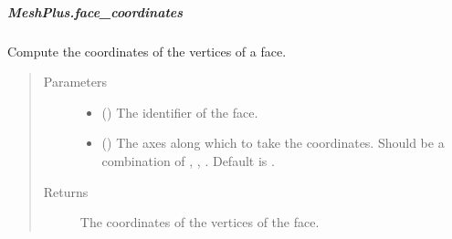 \documentclass[letterpaper,10pt,english]{sphinxmanual}
\begin{document}
\begin{fulllineitems}
\begin{fulllineitems}
\end{fulllineitems}



\subparagraph{MeshPlus.face\_coordinates}
\label{\detokenize{api/generated/directional_clustering.mesh.MeshPlus.face_coordinates:meshplus-face-coordinates}}\label{\detokenize{api/generated/directional_clustering.mesh.MeshPlus.face_coordinates::doc}}

\begin{fulllineitems}
\label{\detokenize{api/generated/directional_clustering.mesh.MeshPlus.face_coordinates:directional_clustering.mesh.MeshPlus.face_coordinates}}
Compute the coordinates of the vertices of a face.
\begin{quote}\begin{description}
\item[{Parameters}] \leavevmode\begin{itemize}
\item {} 
 () \textendash{} The identifier of the face.

\item {} 
 () \textendash{} The axes along which to take the coordinates.
Should be a combination of , , .
Default is .

\end{itemize}

\item[{Returns}] \leavevmode
{} \textendash{} The coordinates of the vertices of the face.

\end{description}\end{quote}

\end{fulllineitems}




\end{fulllineitems}
\end{document}
